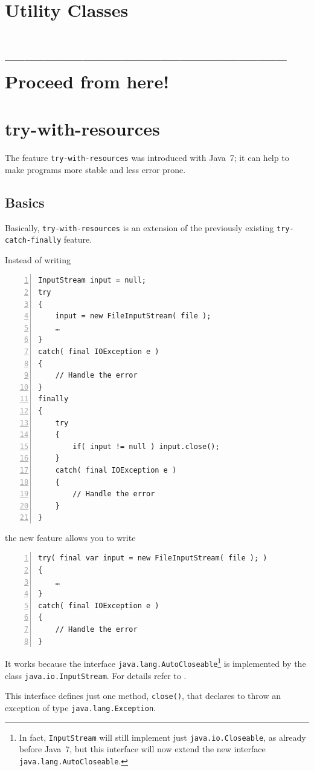 \documentclass[11pt,a4paper, titlepage, parskip=half, headsepline, footsepline, cleardoublepage=current, headheight=1cm]{scrbook}
\begin{document}
\section{Utility Classes}\label{sec:UtilityClasses}
\section{-------------------------------------------- Proceed from here!}
\lipsum[5]

\section{try-with-resources}\label{sec:TryWithResources}
The feature \lstinline|try-with-resources| was introduced with Java~7; it can help to make programs more stable and less error prone.

\subsection{Basics}
Basically, \lstinline|try-with-resources|\autocite{ORACLE_DOC_LANGUAGE_SPECIFICATION:TryWithResources} is an extension of the previously existing \lstinline|try-catch-finally| feature.

Instead of writing
\begin{lstlisting}[numbers=left]
InputStream input = null;
try
{
    input = new FileInputStream( file );
    …
}
catch( final IOException e )
{
    // Handle the error
}
finally
{
    try
    {
        if( input != null ) input.close();
    }
    catch( final IOException e )
    {
        // Handle the error
    }
}
\end{lstlisting}

the new feature allows you to write

\begin{lstlisting}[numbers=left]
try( final var input = new FileInputStream( file ); )
{
    …
}
catch( final IOException e )
{
    // Handle the error
}
\end{lstlisting}

It works because the interface \lstinline|java.lang.AutoCloseable|\footnote{In fact, \lstinline|InputStream| will still implement just \lstinline|java.io.Closeable|, as already before Java~7, but this interface will now extend the new interface \lstinline|java.lang.AutoCloseable|.} is implemented by the class \lstinline|java.io.InputStream|. For details refer to \autocite{ORACLE_DOC_AUTOCLOSEABLE_INTERFACE}.

This interface defines just one method, \lstinline|close()|, that declares to throw an exception of type \lstinline|java.lang.Exception|.
\end{document}
